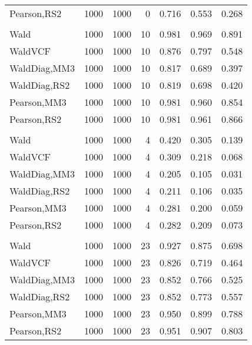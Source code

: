 \documentclass[
]{article}
\begin{document}
\begin{table}[H]
{\begin{tabular}[t]{lrrrrrr}
\hspace{1em}Pearson,RS2 & 1000 & 1000 & 0 & 0.716 & 0.553 & 0.268\\
\addlinespace[0.3em]
\multicolumn{7}{l}{\textbf{1F 15V}}\\
\hspace{1em}Wald & 1000 & 1000 & 10 & 0.981 & 0.969 & 0.891\\
\hspace{1em}WaldVCF & 1000 & 1000 & 10 & 0.876 & 0.797 & 0.548\\
\hspace{1em}WaldDiag,MM3 & 1000 & 1000 & 10 & 0.817 & 0.689 & 0.397\\
\hspace{1em}WaldDiag,RS2 & 1000 & 1000 & 10 & 0.819 & 0.698 & 0.420\\
\hspace{1em}Pearson,MM3 & 1000 & 1000 & 10 & 0.981 & 0.960 & 0.854\\
\hspace{1em}Pearson,RS2 & 1000 & 1000 & 10 & 0.981 & 0.961 & 0.866\\
\addlinespace[0.3em]
\multicolumn{7}{l}{\textbf{2F 10V}}\\
\hspace{1em}Wald & 1000 & 1000 & 4 & 0.420 & 0.305 & 0.139\\
\hspace{1em}WaldVCF & 1000 & 1000 & 4 & 0.309 & 0.218 & 0.068\\
\hspace{1em}WaldDiag,MM3 & 1000 & 1000 & 4 & 0.205 & 0.105 & 0.031\\
\hspace{1em}WaldDiag,RS2 & 1000 & 1000 & 4 & 0.211 & 0.106 & 0.035\\
\hspace{1em}Pearson,MM3 & 1000 & 1000 & 4 & 0.281 & 0.200 & 0.059\\
\hspace{1em}Pearson,RS2 & 1000 & 1000 & 4 & 0.282 & 0.209 & 0.073\\
\addlinespace[0.3em]
\multicolumn{7}{l}{\textbf{3F 15V}}\\
\hspace{1em}Wald & 1000 & 1000 & 23 & 0.927 & 0.875 & 0.698\\
\hspace{1em}WaldVCF & 1000 & 1000 & 23 & 0.826 & 0.719 & 0.464\\
\hspace{1em}WaldDiag,MM3 & 1000 & 1000 & 23 & 0.852 & 0.766 & 0.525\\
\hspace{1em}WaldDiag,RS2 & 1000 & 1000 & 23 & 0.852 & 0.773 & 0.557\\
\hspace{1em}Pearson,MM3 & 1000 & 1000 & 23 & 0.950 & 0.899 & 0.788\\
\hspace{1em}Pearson,RS2 & 1000 & 1000 & 23 & 0.951 & 0.907 & 0.803\\
\bottomrule
\end{tabular}}
\endgroup{}
\end{table}
\end{document}
